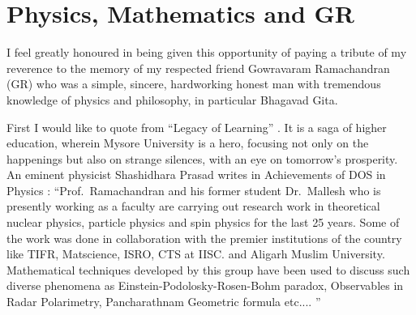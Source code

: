 \chapter{Physics, Mathematics and GR}\label{chap17}



I feel greatly honoured in being given this opportunity of paying a tribute of my reverence to the memory of my respected friend Gowrava\-ram Ramachandran (GR) who was a simple, sincere, hardworking honest man with tremendous knowledge of physics and philosophy, in particular Bhagavad Gita.

First I would like to quote from “Legacy of Learning” \cite{chap17-key01BSK}. It is a saga of higher education, wherein Mysore University is a hero, focusing not only on the happenings but also on strange silences, with an eye on tomorrow's prosperity. An eminent physicist Shashidhara Prasad writes in Achievements of DOS in Physics \cite{chap17-key02BSK}: “Prof.\ Ramachandran and his former student Dr.\ Mallesh who is presently working as a faculty are carrying out research work in theoretical nuclear physics, particle physics and spin physics for the last 25 years. Some of the work was done in collaboration with the premier institutions of the country like TIFR, Matscience, ISRO, CTS at IISC. and Aligarh Muslim University. Mathematical techniques developed by this group have been used to discuss such diverse phenomena as Einstein-Podolosky-Rosen-Bohm paradox, Observables in Radar Polarimetry, Pancharathnam Geometric formula etc.... ”

